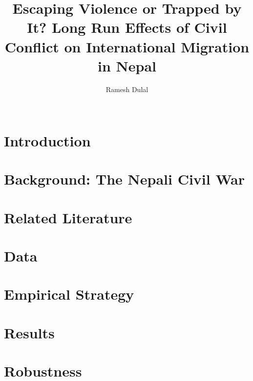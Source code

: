 \documentclass[11pt]{article}
\title{Escaping Violence or Trapped by It? Long Run Effects of Civil Conflict on International Migration in Nepal}
\author{}
\author{Ramesh Dulal\\ \\\texttt{}}
\newif\ifblinded
\newcommand{\keywords}[1]{\par\noindent\textbf{Keywords: }#1}
\newcommand{\jel}[1]{\par\noindent\textbf{JEL Codes: }#1}
\begin{document}
\maketitle
\doublespacing %


\begin{abstract}

\end{abstract}


\ifblinded\else
\fi


\section{Introduction}


\newpage

\section{Background: The Nepali Civil War}


\newpage
\section{Related Literature}


\newpage
\section{Data}


\newpage
\section{Empirical Strategy}


\newpage
\section{Results}


\newpage
\section{Robustness }

\end{document}

